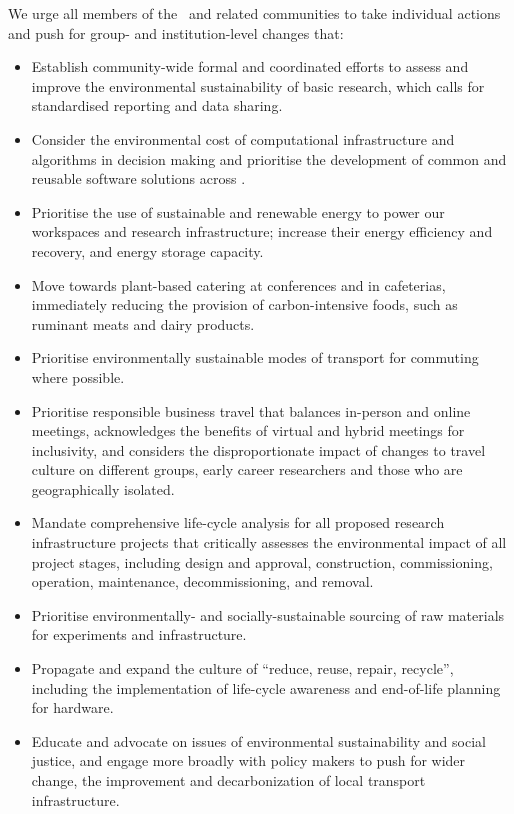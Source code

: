 \documentclass[../SustainableHEP.tex]{subfiles}
\begin{document}
We urge all members of the \ACR\ and related communities to take individual actions and push for group- and institution-level changes that:
\begin{itemize}
    \item Establish community-wide formal and coordinated efforts to assess and improve the environmental sustainability of basic research, which calls for standardised reporting and data sharing.
      \item Consider the environmental cost of computational infrastructure and algorithms in decision making and prioritise the development of common and reusable software solutions across \ACR.
     \item Prioritise the use of sustainable and renewable energy to power our workspaces and research infrastructure; increase their energy efficiency and recovery, and energy storage capacity.
    \item Move towards plant-based catering at conferences and in cafeterias, immediately reducing the provision of carbon-intensive foods, such as ruminant meats and dairy products.
    \item Prioritise environmentally sustainable modes of transport for commuting where possible.
    \item Prioritise responsible business travel that balances in-person and online meetings, acknowledges the benefits of virtual and hybrid meetings for inclusivity, and considers the disproportionate impact of changes to travel culture on different groups, \eg early career researchers and those who are geographically isolated.
    \item Mandate comprehensive life-cycle analysis for all proposed research infrastructure projects that critically assesses the environmental impact of all project stages, including design and approval, construction, commissioning, operation, maintenance, decommissioning, and removal.
     \item Prioritise environmentally- and socially-sustainable sourcing of raw materials for experiments and infrastructure.
     \item Propagate and expand the culture of ``reduce, reuse, repair, recycle'', including the implementation of life-cycle awareness and end-of-life planning for hardware.
    \item Educate and advocate on issues of environmental sustainability and social justice,  and engage more broadly with policy makers to push for wider change, \eg the improvement and decarbonization of local transport infrastructure.
\end{itemize}
\end{document}
